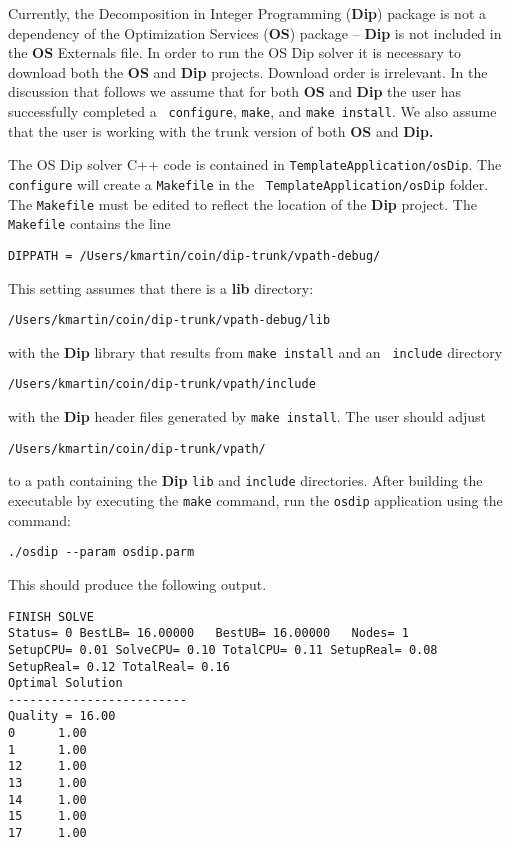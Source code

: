 \label{section:buildDip}

Currently, the Decomposition in Integer Programming ({\bf Dip}) package is not a
dependency of the Optimization Services ({\bf OS}) package -- {\bf Dip} is not
included in the {\bf OS} Externals file. In order to run the OS Dip solver it is
necessary to download both the {\bf OS} and {\bf  Dip} projects. Download order is irrelevant. 
In the discussion that follows we assume that for both 
{\bf OS} and {\bf Dip} the user has successfully completed a {\tt
configure}, {\tt make}, and {\tt make install}. We also assume
that the user is working with the trunk version of both {\bf OS} and {\bf Dip.}


The OS Dip solver C++ code is contained in {\tt TemplateApplication/osDip}.
 The {\tt configure}  will create a {\tt Makefile}  in the {\tt
 TemplateApplication/osDip} folder. The {\tt Makefile} must be edited to reflect
 the location of the {\bf Dip} project. The {\tt Makefile} contains the
 line

\begin{verbatim}
DIPPATH = /Users/kmartin/coin/dip-trunk/vpath-debug/
\end{verbatim}

This setting assumes that there is a {\bf lib} directory:

\begin{verbatim}
/Users/kmartin/coin/dip-trunk/vpath-debug/lib
\end{verbatim}
with the {\bf Dip} library that results from {\tt make install} and an {\tt
include} directory
\begin{verbatim}
/Users/kmartin/coin/dip-trunk/vpath/include
\end{verbatim}
with the {\bf Dip} header files generated by {\tt make install}.  The user
should adjust
\begin{verbatim}
/Users/kmartin/coin/dip-trunk/vpath/
\end{verbatim}
to a path containing the {\bf Dip} {\tt lib} and {\tt include} directories. 
After building the executable by executing the {\tt make} command,
 run the {\tt osdip} application using the command:

\begin{verbatim}
./osdip --param osdip.parm
\end{verbatim}

This should produce the following output.


\begin{verbatim}
FINISH SOLVE
Status= 0 BestLB= 16.00000   BestUB= 16.00000   Nodes= 1      
SetupCPU= 0.01 SolveCPU= 0.10 TotalCPU= 0.11 SetupReal= 0.08 
SetupReal= 0.12 TotalReal= 0.16
Optimal Solution
-------------------------
Quality = 16.00
0      1.00
1      1.00
12     1.00
13     1.00
14     1.00
15     1.00
17     1.00

\end{verbatim}

